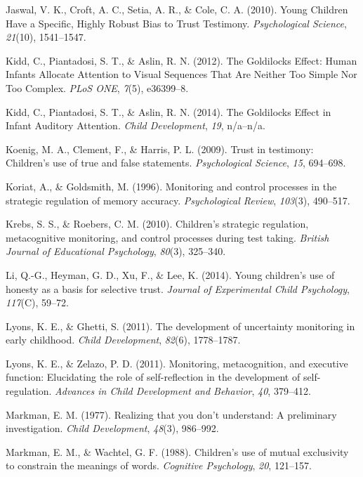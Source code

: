 \documentclass[a4paper,man,apacite,floatsintext]{apa6}
\begin{document}
\hypertarget{ref-Jaswal2010}{}
Jaswal, V. K., Croft, A. C., Setia, A. R., \& Cole, C. A. (2010). Young
Children Have a Specific, Highly Robust Bias to Trust Testimony.
\emph{Psychological Science}, \emph{21}(10), 1541--1547.

\hypertarget{ref-Kidd2012}{}
Kidd, C., Piantadosi, S. T., \& Aslin, R. N. (2012). The Goldilocks
Effect: Human Infants Allocate Attention to Visual Sequences That Are
Neither Too Simple Nor Too Complex. \emph{PLoS ONE}, \emph{7}(5),
e36399--8.

\hypertarget{ref-Kidd2014}{}
Kidd, C., Piantadosi, S. T., \& Aslin, R. N. (2014). The Goldilocks
Effect in Infant Auditory Attention. \emph{Child Development},
\emph{19}, n/a--n/a.

\hypertarget{ref-Koenig2009}{}
Koenig, M. A., Clement, F., \& Harris, P. L. (2009). Trust in testimony:
Children's use of true and false statements. \emph{Psychological
Science}, \emph{15}, 694--698.

\hypertarget{ref-Koriat1996}{}
Koriat, A., \& Goldsmith, M. (1996). Monitoring and control processes in
the strategic regulation of memory accuracy. \emph{Psychological
Review}, \emph{103}(3), 490--517.

\hypertarget{ref-Krebs2010}{}
Krebs, S. S., \& Roebers, C. M. (2010). Children's strategic regulation,
metacognitive monitoring, and control processes during test taking.
\emph{British Journal of Educational Psychology}, \emph{80}(3),
325--340.

\hypertarget{ref-Li2014}{}
Li, Q.-G., Heyman, G. D., Xu, F., \& Lee, K. (2014). Young children's
use of honesty as a basis for selective trust. \emph{Journal of
Experimental Child Psychology}, \emph{117}(C), 59--72.

\hypertarget{ref-Lyons2011a}{}
Lyons, K. E., \& Ghetti, S. (2011). The development of uncertainty
monitoring in early childhood. \emph{Child Development}, \emph{82}(6),
1778--1787.

\hypertarget{ref-Lyons2011}{}
Lyons, K. E., \& Zelazo, P. D. (2011). Monitoring, metacognition, and
executive function: Elucidating the role of self-reflection in the
development of self-regulation. \emph{Advances in Child Development and
Behavior}, \emph{40}, 379--412.

\hypertarget{ref-Markman1977}{}
Markman, E. M. (1977). Realizing that you don't understand: A
preliminary investigation. \emph{Child Development}, \emph{48}(3),
986--992.

\hypertarget{ref-Markman1988}{}
Markman, E. M., \& Wachtel, G. F. (1988). Children's use of mutual
exclusivity to constrain the meanings of words. \emph{Cognitive
Psychology}, \emph{20}, 121--157.
\end{document}
